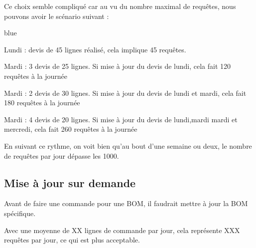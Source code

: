 Ce choix semble compliqué car au vu du nombre maximal de requêtes, nous pouvons avoir le scénario suivant : 


\begin{items}{blue}{\Triangle}
\item Lundi : devis de 45 lignes réalisé, cela implique 45 requêtes.
\item Mardi : 3 devis de 25 lignes. Si mise à jour du devis de lundi, cela fait 120 requêtes à la journée
\item Mardi : 2 devis de 30 lignes. Si mise à jour du devis de lundi et mardi, cela fait 180 requêtes à la journée
\item Mardi : 4 devis de 20 lignes. Si mise à jour du devis de lundi,mardi mardi et mercredi, cela fait 260 requêtes à la journée
\end{items}
En suivant ce rythme, on voit bien qu'au bout d'une semaine ou deux, le nombre de requêtes par jour dépasse les 1000.

\subsection{Mise à jour sur demande}

Avant de faire une commande pour une BOM, il faudrait mettre à jour la BOM spécifique.

Avec une moyenne de XX lignes de commande par jour, cela représente XXX requêtes par jour, ce qui est plus acceptable.

